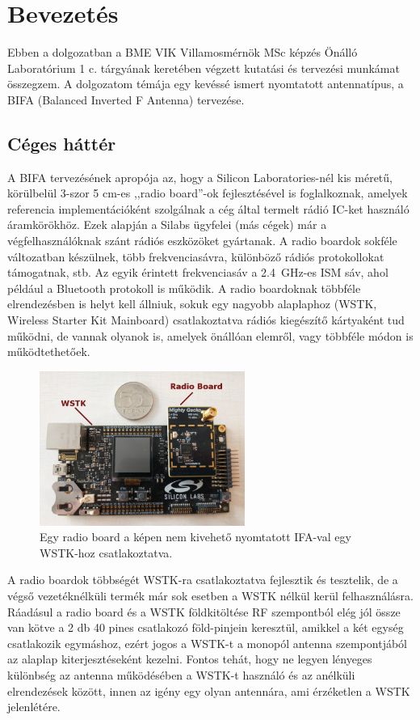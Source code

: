 \chapter{Bevezetés}
Ebben a dolgozatban a BME VIK Villamosmérnök MSc képzés Önálló Laboratórium 1 c. tárgyának keretében végzett kutatási és tervezési munkámat összegzem. A dolgozatom témája egy kevéssé ismert nyomtatott antennatípus, a BIFA (Balanced Inverted F Antenna) tervezése.
\section{Céges háttér}
A BIFA tervezésének apropója az, hogy a Silicon Laboratories-nél kis méretű, körülbelül 3-szor 5 cm-es ,,radio board''-ok fejlesztésével is foglalkoznak, amelyek referencia implementációként szolgálnak a cég által termelt rádió IC-ket használó áramkörökhöz. Ezek alapján a Silabs ügyfelei (más cégek) már a végfelhasználóknak szánt rádiós eszközöket gyártanak. A radio boardok sokféle változatban készülnek, több frekvenciasávra, különböző rádiós protokollokat támogatnak, stb. Az egyik érintett frekvenciasáv a \SI{2,4}{GHz}-es ISM sáv, ahol például a Bluetooth protokoll is működik. A radio boardoknak többféle elrendezésben is helyt kell állniuk, sokuk egy nagyobb alaplaphoz (WSTK, Wireless Starter Kit Mainboard) csatlakoztatva rádiós kiegészítő kártyaként tud működni, de vannak olyanok is, amelyek önállóan elemről, vagy többféle módon is működtethetőek.
\begin{figure}[h]
	\centering
	\includegraphics[width=0.6\textwidth]{kep/wstk-rb.jpg}
	\caption{Egy radio board a képen nem kivehető nyomtatott IFA-val egy WSTK-hoz csatlakoztatva.}
	\label{fig:wstk-rb}
\end{figure}
\par A radio boardok többségét WSTK-ra csatlakoztatva fejlesztik és tesztelik, de a végső vezetéknélküli termék már sok esetben a WSTK nélkül kerül felhasználásra. Ráadásul a radio board és a WSTK földkitöltése RF szempontból elég jól össze van kötve a 2 db 40 pines csatlakozó föld-pinjein keresztül, amikkel a két egység csatlakozik egymáshoz, ezért jogos a WSTK-t a monopól antenna szempontjából az alaplap kiterjesztéseként kezelni. Fontos tehát, hogy ne legyen lényeges különbség az antenna működésében a WSTK-t használó és az anélküli elrendezések között, innen az igény egy olyan antennára, ami érzéketlen a WSTK jelenlétére.
